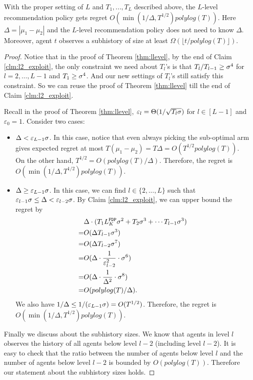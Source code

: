 \begin{corollary}
\label{cor:llevel}
With the proper setting of $L$ and $T_1,...,T_L$ described above, the $L$-level recommendation policy gets regret $O(\min(1/\Delta, T^{1/2})polylog(T))$. Here $\Delta = |\mu_1 -\mu_2|$ and the $L$-level recommendation policy does not need to know $\Delta$. Moreover, agent $t$ observes a subhistory of size at least $\Omega( \lfloor t/polylog(T)\rfloor)$.
\end{corollary}

\begin{proof}
Notice that in the proof of Theorem \ref{thm:llevel}, by the end of Claim \ref{clm:l2_exploit}, the only constraint we need about $T_l$'s is that $T_l / T_{l-1} \geq \sigma^4$ for $l=2,...,L-1$ and $T_1 \geq \sigma^4$. And our new settings of $T_l$'s still satisfy this constraint. So we can reuse the proof of Theorem \ref{thm:llevel} till the end of Claim \ref{clm:l2_exploit}.

Recall in the proof of Theorem \ref{thm:llevel}, $\varepsilon_l =\Theta(1/\sqrt{T_l \sigma})$ for $l \in [L-1]$ and $\varepsilon_0 = 1$. Consider two cases:
\begin{itemize}
\item $\Delta < \varepsilon_{L-1} \sigma$. In this case, notice that even always picking the sub-optimal arm gives expected regret at most $T(\mu_1-\mu_2) = T\Delta = O(T^{1/2} polylog(T))$. On the other hand, $T^{1/2} = O(polylog(T)/\Delta)$. Therefore, the regret is $O(\min(1/\Delta, T^{1/2})polylog(T))$.
\item $\Delta \geq \varepsilon_{L-1} \sigma$. In this case, we can find $l \in \{2,...,L\}$ such that $\varepsilon_{l-1} \sigma\leq \Delta < \varepsilon_{l-2} \sigma$. By Claim \ref{clm:l2_exploit}, we can upper bound the regret by
\begin{align*}
&\Delta \cdot (T_1 L^\mathtt{FDP}_K \sigma^2  +T_2 \sigma^3+ \cdots T_{l-1} \sigma^3)\\
=& O(\Delta T_{l-1}\sigma^3) \\
=&O(\Delta T_{l-2}\sigma^7) \\
=&O(\Delta\cdot  \frac{1}{\varepsilon^2_{l-2}}\cdot \sigma^6)\\
=&O(\Delta \cdot \frac{1}{\Delta^2}\cdot \sigma^8)\\
=&O(polylog(T)/\Delta).
\end{align*}
We also have $1/\Delta \leq 1/(\varepsilon_{L-1}\sigma)= O(T^{1/2})$. Therefore, the regret is $O(\min(1/\Delta, T^{1/2})polylog(T))$.
\end{itemize}

Finally we discuss about the subhistory sizes. We know that agents in level $l$ observes the history of all agents below level $l-2$ (including level $l-2$). It is easy to check that the ratio between the number of agents below level $l$ and the number of agents below level $l-2$ is bounded by $O(polylog(T))$. Therefore our statement about the subhistory sizes holds.
\end{proof}

